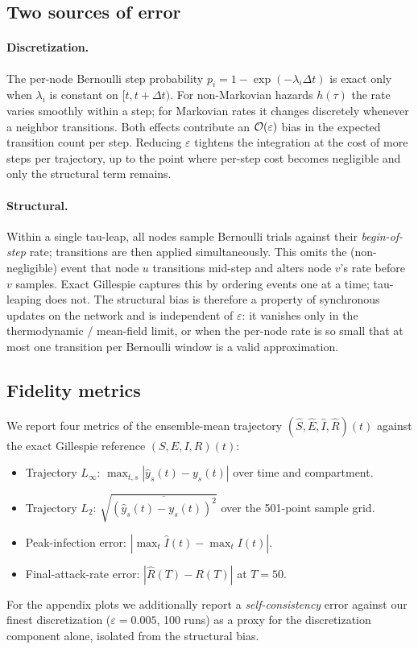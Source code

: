 \subsection{Two sources of error}

\paragraph{Discretization.} The per-node Bernoulli step probability $p_i = 1 - \exp(-\lambda_i \Delta t)$ is exact only when $\lambda_i$ is constant on $[t, t + \Delta t)$. For non-Markovian hazards $h(\tau)$ the rate varies smoothly within a step; for Markovian rates it changes discretely whenever a neighbor transitions. Both effects contribute an $\mathcal{O}(\varepsilon)$ bias in the expected transition count per step. Reducing $\varepsilon$ tightens the integration at the cost of more steps per trajectory, up to the point where per-step cost becomes negligible and only the structural term remains.

\paragraph{Structural.} Within a single tau-leap, all nodes sample Bernoulli trials against their \emph{begin-of-step} rate; transitions are then applied simultaneously. This omits the (non-negligible) event that node $u$ transitions mid-step and alters node $v$'s rate before $v$ samples. Exact Gillespie captures this by ordering events one at a time; tau-leaping does not. The structural bias is therefore a property of synchronous updates on the network and is independent of $\varepsilon$: it vanishes only in the thermodynamic / mean-field limit, or when the per-node rate is so small that at most one transition per Bernoulli window is a valid approximation.

\subsection{Fidelity metrics}

We report four metrics of the ensemble-mean trajectory $(\hat S, \hat E, \hat I, \hat R)(t)$ against the exact Gillespie reference $(S, E, I, R)(t)$:
\begin{itemize}
\item Trajectory $L_\infty$: $\max_{t, s} |\hat y_s(t) - y_s(t)|$ over time and compartment.
\item Trajectory $L_2$: $\sqrt{\overline{(\hat y_s(t) - y_s(t))^2}}$ over the 501-point sample grid.
\item Peak-infection error: $|\max_t \hat I(t) - \max_t I(t)|$.
\item Final-attack-rate error: $|\hat R(T) - R(T)|$ at $T = 50$.
\end{itemize}
For the appendix plots we additionally report a \emph{self-consistency} error against our finest discretization ($\varepsilon = 0.005$, 100 runs) as a proxy for the discretization component alone, isolated from the structural bias.

